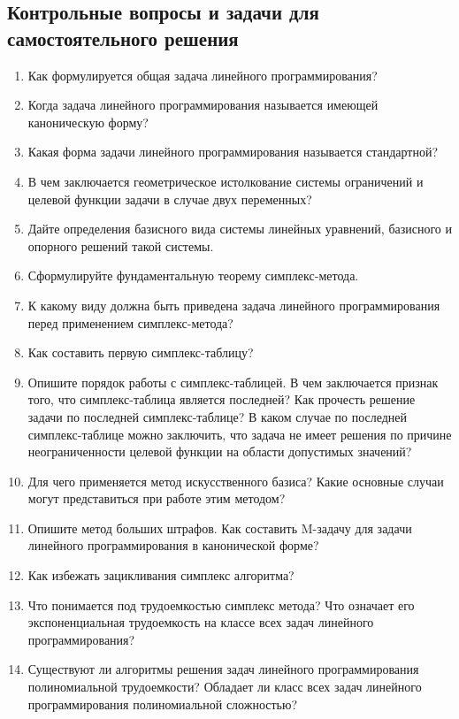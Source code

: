 \subsection*{Контрольные вопросы и задачи для самостоятельного решения}
\begin {enumerate}
\item Как формулируется общая задача линейного программирования?
\item Когда задача линейного программирования называется имеющей каноническую форму?
\item Какая форма задачи линейного программирования называется стандартной?
\item В чем заключается геометрическое истолкование системы ограничений и целевой функции задачи в случае двух переменных?
\item Дайте определения базисного вида системы линейных уравнений, базисного и опорного решений такой системы.
\item Сформулируйте фундаментальную теорему симплекс-метода.
\item К какому виду должна быть приведена задача линейного программирования перед применением симплекс-метода?
\item Как составить первую симплекс-таблицу?
\item Опишите порядок работы с симплекс-таблицей. В чем заключается признак того, что симплекс-таблица является последней? Как прочесть решение задачи по последней симплекс-таблице? В каком случае по последней симплекс-таблице можно заключить, что задача не имеет решения по причине неограниченности целевой функции на области допустимых значений?
\item Для чего применяется метод искусственного базиса? Какие основные случаи могут представиться при работе этим методом?
\item Опишите метод больших штрафов. Как составить M-задачу для задачи линейного программирования в канонической форме?
\item Как избежать зацикливания симплекс алгоритма?
\item Что понимается под трудоемкостью симплекс метода? Что означает его экспоненциальная трудоемкость на классе всех задач линейного программирования?
\item Существуют ли алгоритмы решения задач линейного программирования полиномиальной трудоемкости? Обладает ли класс всех задач линейного программирования полиномиальной сложностью?
\end{enumerate}
\vspace{6pt}

